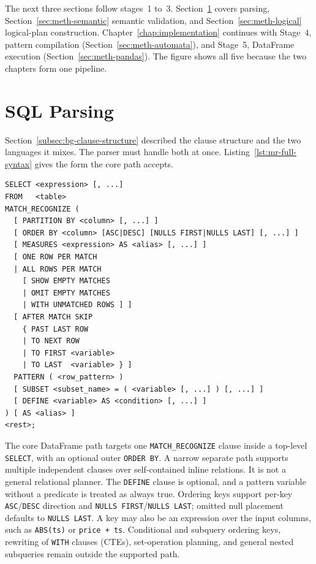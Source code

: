 The next three sections follow stages~1 to~3.
Section~\ref{sec:meth-compiler} covers parsing,
Section~\ref{sec:meth-semantic} semantic validation, and
Section~\ref{sec:meth-logical} logical-plan construction.
Chapter~\ref{chap:implementation} continues with Stage~4, pattern
compilation (Section~\ref{sec:meth-automata}), and Stage~5, DataFrame
execution (Section~\ref{sec:meth-pandas}).  The figure shows all five
because the two chapters form one pipeline.

\section{SQL Parsing}
\label{sec:meth-compiler}

Section~\ref{subsec:bg-clause-structure} described the clause
structure and the two languages it mixes.  The parser must handle both
at once.  Listing~\ref{lst:mr-full-syntax} gives the form the core path
accepts.

\begin{lstlisting}[float=htbp,
    language   = {},
    caption    = {Clause structure used by the supported
                  \texttt{MATCH\_RECOGNIZE} path},
    label      = {lst:mr-full-syntax},
    basicstyle = \ttfamily\footnotesize
]
SELECT <expression> [, ...]
FROM   <table>
MATCH_RECOGNIZE (
  [ PARTITION BY <column> [, ...] ]
  [ ORDER BY <column> [ASC|DESC] [NULLS FIRST|NULLS LAST] [, ...] ]
  [ MEASURES <expression> AS <alias> [, ...] ]
  [ ONE ROW PER MATCH
  | ALL ROWS PER MATCH
    [ SHOW EMPTY MATCHES
    | OMIT EMPTY MATCHES
    | WITH UNMATCHED ROWS ] ]
  [ AFTER MATCH SKIP
    { PAST LAST ROW
    | TO NEXT ROW
    | TO FIRST <variable>
    | TO LAST  <variable> } ]
  PATTERN ( <row_pattern> )
  [ SUBSET <subset_name> = ( <variable> [, ...] ) [, ...] ]
  [ DEFINE <variable> AS <condition> [, ...] ]
) [ AS <alias> ]
<rest>;
\end{lstlisting}

The core DataFrame path targets one \texttt{MATCH\_RECOGNIZE} clause
inside a top-level \texttt{SELECT}, with an optional outer
\texttt{ORDER~BY}.  A narrow separate path supports multiple
independent clauses over self-contained inline relations.  It is not a
general relational planner.  The \texttt{DEFINE} clause is optional,
and a pattern variable without a predicate is treated as always true.
Ordering keys support per-key \texttt{ASC}/\texttt{DESC} direction
and \texttt{NULLS FIRST}/\texttt{NULLS LAST}; omitted null placement
defaults to \texttt{NULLS LAST}.  A key may also be an expression over
the input columns, such as \texttt{ABS(ts)} or \texttt{price + ts}.
Conditional and subquery ordering keys, rewriting of \texttt{WITH}
clauses (CTEs), set-operation planning, and general nested subqueries
remain outside the supported path.

